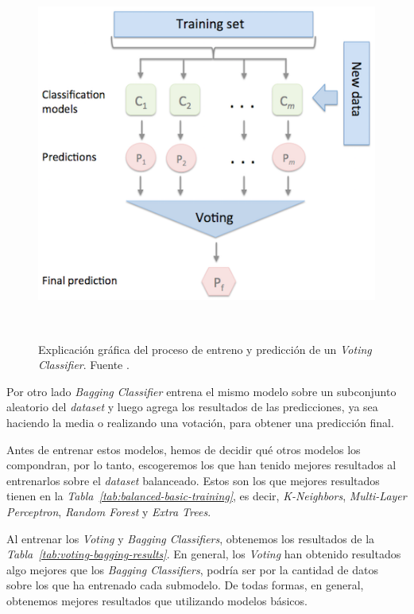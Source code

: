 \begin{figure}[!h]
    \centering
    \includegraphics[width=0.7\linewidth]{media/images/majority_voting.png}
    \caption{Explicación gráfica del proceso de entreno y predicción de un \textit{Voting Classifier}. Fuente \cite{Ensemble96:online}.}\ \label{fig:voting-classifiers}
\end{figure}

Por otro lado \textit{Bagging Classifier} entrena el mismo modelo sobre un subconjunto aleatorio del \textit{dataset} y luego agrega los resultados de las predicciones, ya sea haciendo la media o realizando una votación, para obtener una predicción final.\ \cite{sklearne53:online}


Antes de entrenar estos modelos, hemos de decidir qué otros modelos los compondran, por lo tanto, escogeremos los que han tenido mejores resultados al entrenarlos sobre el \textit{dataset} balanceado. Estos son los que mejores resultados tienen en la \textit{Tabla\ \ref{tab:balanced-basic-training}}, es decir, \textit{K-Neighbors}, \textit{Multi-Layer Perceptron}, \textit{Random Forest} y \textit{Extra Trees}.

Al entrenar los \textit{Voting} y \textit{Bagging Classifiers}, obtenemos los resultados de la \textit{Tabla\ \ref{tab:voting-bagging-results}}. En general, los \textit{Voting} han obtenido resultados algo mejores que los \textit{Bagging Classifiers}, podría ser por la cantidad de datos sobre los que ha entrenado cada submodelo. De todas formas, en general, obtenemos mejores resultados que utilizando modelos básicos.

